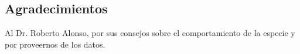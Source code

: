 \documentclass[a0,portrait]{a0poster}
\begin{document}
\begin{multicols}{3}

\section*{Agradecimientos}

Al Dr. Roberto Alonso, por sus consejos sobre el comportamiento de la especie y por proveernos de los datos.

\end{multicols}
\end{document}
